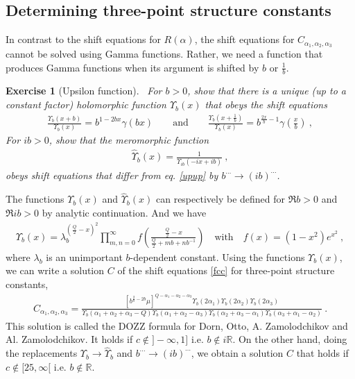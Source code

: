 \documentclass[12pt, a4paper]{article}
\theoremstyle{break}
\newtheorem{exo}{Exercise}[section]
\begin{document}
\subsection{Determining three-point structure constants}

In contrast to the shift equations for $R(\alpha)$, the shift equations for $C_{\alpha_1,\alpha_2,\alpha_3}$ cannot be solved using Gamma functions. Rather, we need a function that produces Gamma functions when its argument is shifted by $b$ or $\frac{1}{b}$. 

\begin{exo}[Upsilon function]
~\label{exo:upsilon}
 For $b>0$, show that there is a unique (up to a constant factor) holomorphic function $\Upsilon_b(x)$ that obeys the shift equations
 \begin{align}
  \frac{\Upsilon_b(x+b)}{\Upsilon_b(x)} = b^{1-2bx} \gamma(bx)\qquad \text{and} \qquad \frac{\Upsilon_b(x+\frac{1}{b})}{\Upsilon_b(x)} = b^{\frac{2x}{b}-1} \gamma(\tfrac{x}{b})\ ,
\label{upup}
\end{align}
For $ib>0$, show that the meromorphic function 
\begin{align}
 \hat{\Upsilon}_b(x) = \frac{1}{\Upsilon_{ib}(-ix+ib)}\ ,
\end{align}
obeys shift equations that differ from eq. \eqref{upup} by $b^{\cdots} \to (ib)^{\cdots}$.
\end{exo}
The functions $\Upsilon_b(x)$ and $\hat\Upsilon_b(x)$ can respectively be defined for $\Re b>0$ and $\Re ib>0$ by analytic continuation. And we have 
\begin{align}
 \Upsilon_b(x) = \lambda_b^{(\frac{Q}{2}-x)^2}\prod_{m,n=0}^\infty f\left(\frac{\frac{Q}{2}-x}{\frac{Q}{2}+mb+nb^{-1}}\right) \quad \text{with} \quad f(x)=(1-x^2)e^{x^2}\ ,
\end{align}
where $\lambda_b$ is an unimportant $b$-dependent constant.
Using the functions $\Upsilon_b(x)$, we can write a solution $C$ of the shift equations \eqref{fcc} for three-point structure constants,
\begin{align}
 C_{\alpha_1,\alpha_2,\alpha_3} =  \frac{\left[b^{\frac{2}{b}-2b}\mu\right]^{Q-\alpha_1-\alpha_2-\alpha_3} \Upsilon_b(2\alpha_1) \Upsilon_b(2\alpha_2) \Upsilon_b(2\alpha_3)}{\Upsilon_b(\alpha_1+\alpha_2+\alpha_3-Q) \Upsilon_b(\alpha_1+\alpha_2-\alpha_3)\Upsilon_b(\alpha_2+\alpha_3-\alpha_1)\Upsilon_b(\alpha_3+\alpha_1-\alpha_2)} \ .
\label{caaa}
\end{align}
This solution is called the DOZZ formula for Dorn, Otto, A.
Zamolodchikov and Al. Zamolodchikov. It holds if
$c\notin ]-\infty, 1]$ i.e. $b\notin i\mathbb{R}$. 
On the other hand, doing the replacements $\Upsilon_b\to \hat\Upsilon_b$ and $b^{\cdots} \to (ib)^{\cdots}$, we obtain a solution $\hat C$ that holds if  $c\notin [25,\infty[$ i.e. $b\notin \mathbb{R}$.
\end{document}
